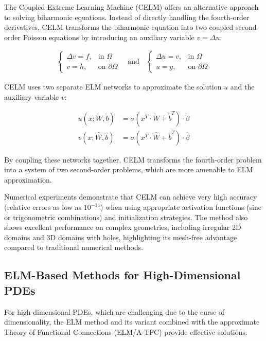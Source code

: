 \documentclass[11pt]{article}
\begin{document}
The Coupled Extreme Learning Machine (CELM) \citep{Li2022} offers an alternative approach to solving biharmonic equations. Instead of directly handling the fourth-order derivatives, CELM transforms the biharmonic equation into two coupled second-order Poisson equations by introducing an auxiliary variable $v = \Delta u$:

\begin{align}
\begin{cases}
\Delta v = f, & \text{in } \Omega \\
v = h, & \text{on } \partial\Omega
\end{cases}
\quad \text{and} \quad
\begin{cases}
\Delta u = v, & \text{in } \Omega \\
u = g, & \text{on } \partial\Omega
\end{cases}
\end{align}

CELM uses two separate ELM networks to approximate the solution $u$ and the auxiliary variable $v$:

\begin{align}
u(x; \tilde{W}, \tilde{b}) &= \sigma(x^T \cdot \tilde{W} + \tilde{b}^T) \cdot \tilde{\beta} \\
v(x; \hat{W}, \hat{b}) &= \sigma(x^T \cdot \hat{W} + \hat{b}^T) \cdot \hat{\beta}
\end{align}

By coupling these networks together, CELM transforms the fourth-order problem into a system of two second-order problems, which are more amenable to ELM approximation.

Numerical experiments demonstrate that CELM can achieve very high accuracy (relative errors as low as $10^{-14}$) when using appropriate activation functions (sine or trigonometric combinations) and initialization strategies. The method also shows excellent performance on complex geometries, including irregular 2D domains and 3D domains with holes, highlighting its mesh-free advantage compared to traditional numerical methods.

\subsection{ELM-Based Methods for High-Dimensional PDEs}

For high-dimensional PDEs, which are challenging due to the curse of dimensionality, the ELM method and its variant combined with the approximate Theory of Functional Connections (ELM/A-TFC) \citep{Wang2024} provide effective solutions.
\end{document}
